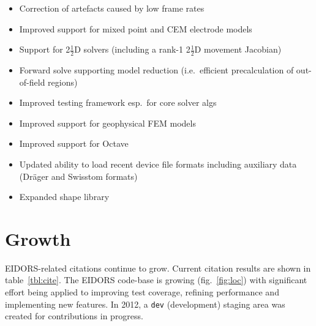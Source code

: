 \documentclass[10pt,letterpaper]{article}
\begin{document}
\begin{multicols}{2}
\begin{itemize}
\item Correction of artefacts caused by low frame rates \cite{yerworth2016}

\item Improved support for mixed point and CEM electrode models


\item Support for 2$\frac{1}{2}$D solvers (including a rank-1 2$\frac{1}{2}$D movement Jacobian)
   \cite{boyle2016model2p5}

\item Forward solve supporting model reduction (i.e.\ efficient
       precalculation of out-of-field regions) \cite{adler2016model}

\item Improved testing framework esp.\ for core solver algs



\item Improved support for geophysical FEM models


\item Improved support for Octave

\item Updated ability to load recent device file formats including
       auxiliary data (Dr\"ager and Swisstom formats)




\item Expanded shape library
\end{itemize}

\section{Growth}
EIDORS-related citations continue to grow. Current citation results are
shown in table~\ref{tbl:cite}.
%
The EIDORS code-base is growing
(fig.~\ref{fig:loc})
 with significant effort being applied to
improving test coverage, refining performance and implementing new features.
 In 2012, a {\tt dev} (development) staging area was created for
contributions in progress.


\end{multicols}
\end{document}
